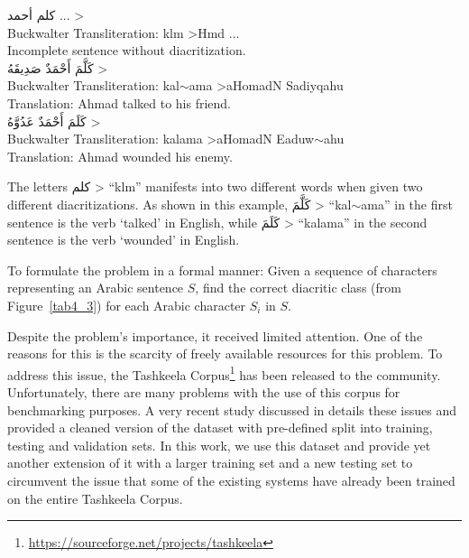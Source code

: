 \documentclass[11pt,a4paper]{article}
\newenvironment{myquote}{\list{}{\leftmargin=0.1in\rightmargin=0.1in}\item[]}{\endlist}
\begin{document}
\begin{myquote}
\centering
\<
كلم أحمد ...
> \\
Buckwalter Transliteration: klm {\textgreater}Hmd ... \\
Incomplete sentence without diacritization. \\
\<
كَلَّمَ أَحْمَدٌ صَدِيقَهُ
>\\
Buckwalter Transliteration: k{\color{red}a}l{\color{red}$\sim$a}m{\color{red}a} {\textgreater}{\color{red}a}H{\color{red}o}m{\color{red}a}d{\color{red}N} S{\color{red}a}d{\color{red}i}yq{\color{red}a}h{\color{red}u} \\
Translation: Ahmad talked to his friend. \\
\<
كَلَمَ أَحْمَدٌ عَدُوَّهُ
> \\
Buckwalter Transliteration: k{\color{red}a}l{\color{red}a}m{\color{red}a} {\textgreater}{\color{red}a}H{\color{red}o}m{\color{red}a}d{\color{red}N} E{\color{red}a}d{\color{red}u}w{\color{red}$\sim$a}h{\color{red}u} \\
Translation: Ahmad wounded his enemy.
\end{myquote}

The letters
\<
كلم 
>
``klm'' manifests into two different words when given two different diacritizations. As shown in this example,
\<
كَلَّمَ 
>
``kal$\sim$ama'' in the first sentence is the verb `talked' in English, while
\<
كَلَمَ
>
``kalama'' in the second sentence is the verb `wounded' in English.

To formulate the problem in a formal manner: Given a sequence of characters representing an Arabic sentence $S$, find the correct diacritic class (from Figure~\ref{tab4_3}) for each Arabic character $S_i$ in $S$.

Despite the problem's importance, it received limited attention. One of the reasons for this is the scarcity of freely available resources for this problem. To address this issue, the Tashkeela Corpus\footnote{\url{https://sourceforge.net/projects/tashkeela}} \cite{zerrouki2017tashkeela} has been released to the community. Unfortunately, there are many problems with the use of this corpus for benchmarking purposes. A very recent study \cite{dataset} discussed in details these issues and provided a cleaned version of the dataset with pre-defined split into training, testing and validation sets. In this work, we use this dataset and provide yet another extension of it with a larger training set and a new testing set to circumvent the issue that some of the existing systems have already been trained on the entire Tashkeela Corpus.
\end{document}
